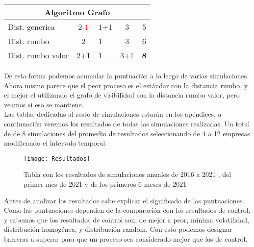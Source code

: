 \documentclass[12pt,a4paper]{article}
\begin{document}
\begin{table}[H]
\begin{tabular}{l|c|l|c|c|}
\hline
\multicolumn{5}{c}{{\cellcolor[rgb]{0.796,0.808,0.984}}Algoritmo Grafo}                                                                                                                                                \\ 
\hline
\rowcolor[rgb]{0.925,0.957,1} Dist. generica                           & 2\textcolor{red}{-1}            & 1\textcolor[rgb]{0,0.502,0}{+1} & 3                               & 5                                       \\
\rowcolor[rgb]{0.855,0.91,0.988} Dist. rumbo                           & 2                               & 1                               & 3                               & 6                                       \\
\rowcolor[rgb]{0.925,0.957,1} Dist. rumbo valor                        & 2\textcolor[rgb]{0,0.502,0}{+1} & 1                               & 3\textcolor[rgb]{0,0.502,0}{+1} & \textcolor[rgb]{0,0.502,0}{\textbf{8}} 
\end{tabular}
\end{table}
De esta forma podemos acumular la puntuación a lo largo de varias simulaciones. Ahora mismo parece que el peor proceso es el estándar con la distancia rumbo, y el mejor el utilizando el grafo de visibilidad con la distancia rumbo valor, pero veamos si eso se mantiene.\\
Las tablas dedicadas al resto de simulaciones estarán en los apéndices, a continuación veremos los resultados de todas las simulaciones realizadas. Un total de de 8 simulaciones del promedio de resultados seleccionando de 4 a 12 empresas modificando el intervalo temporal.
\begin{figure}[H]
    		\centering
    		\texttt{[image: Resultados]}\par
    		\caption{Tabla con los resultados de simulaciones anuales de 2016 a 2021 , del primer mes de 2021 y de los primeros 6 meses de 2021}
		\end{figure}
		Antes de analizar los resultados cabe explicar el significado de las puntuaciones. Como las puntuaciones dependen de la comparación con los resultados de control, y sabemos que los resultados de control son, de mejor a peor, mínima volatilidad, distribución homogénea, y distribución random. Con esto podemos designar barreras a superar para que un proceso sea considerado mejor que los de control.\\
\end{document}
